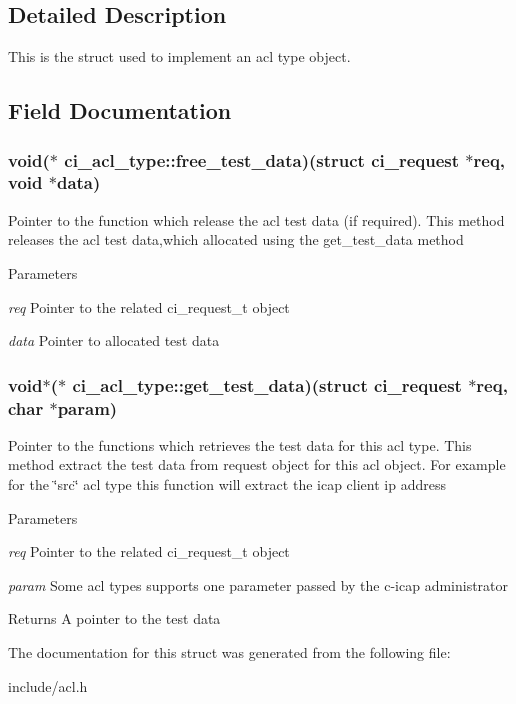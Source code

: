 \subsection{Detailed Description}
This is the struct used to implement an acl type object. 

\subsection{Field Documentation}
\hypertarget{structci__acl__type_ac90a177b4f70ea783e2b19db81c71afe}{
\subsubsection[{free\_\-test\_\-data}]{\setlength{\rightskip}{0pt plus 5cm}void($\ast$ {\bf ci\_\-acl\_\-type::free\_\-test\_\-data})(struct ci\_\-request $\ast$req, void $\ast$data)}}
\label{structci__acl__type_ac90a177b4f70ea783e2b19db81c71afe}


Pointer to the function which release the acl test data (if required). This method releases the acl test data,which allocated using the get\_\-test\_\-data method 
\begin{DoxyParams}{Parameters}
\item[{\em req}]Pointer to the related ci\_\-request\_\-t object \item[{\em data}]Pointer to allocated test data \end{DoxyParams}
\hypertarget{structci__acl__type_a771cf49548b36b0b5ff45f87dab5dc18}{
\subsubsection[{get\_\-test\_\-data}]{\setlength{\rightskip}{0pt plus 5cm}void$\ast$($\ast$ {\bf ci\_\-acl\_\-type::get\_\-test\_\-data})(struct ci\_\-request $\ast$req, char $\ast$param)}}
\label{structci__acl__type_a771cf49548b36b0b5ff45f87dab5dc18}


Pointer to the functions which retrieves the test data for this acl type. This method extract the test data from request object for this acl object. For example for the \char`\"{}src\char`\"{} acl type this function will extract the icap client ip address 
\begin{DoxyParams}{Parameters}
\item[{\em req}]Pointer to the related ci\_\-request\_\-t object \item[{\em param}]Some acl types supports one parameter passed by the c-\/icap administrator \end{DoxyParams}
\begin{DoxyReturn}{Returns}
A pointer to the test data 
\end{DoxyReturn}


The documentation for this struct was generated from the following file:\begin{DoxyCompactItemize}
\item 
include/acl.h\end{DoxyCompactItemize}
